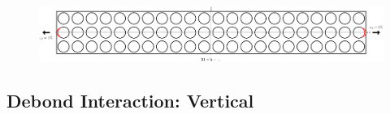 \documentclass[first,firstsupp,lastsupp,last,hyperref,table]{ETHclass}
\begin{document}
\begin{frame}
\begin{columns}[c]
\begin{column}{0.5\textwidth}
\begin{figure}
\end{figure}
\end{column}
\end{columns}
\vspace{-0.25cm}
\begin{figure}
\centering
\includegraphics[width=\textwidth]{twofibers-sameside-strainmagni21.pdf}
\end{figure}
\end{frame}

\subsection{Debond Interaction: Vertical}
\end{document}
